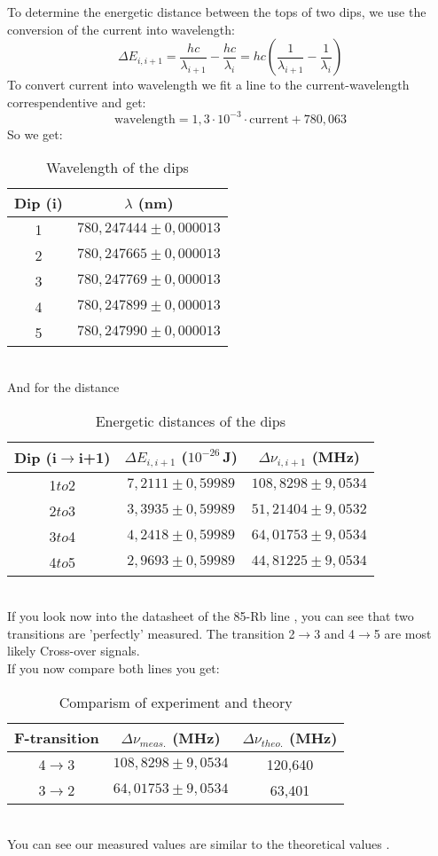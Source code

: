 To determine the energetic distance between the tops of two dips, we use the conversion of the current into wavelength:
\begin{equation}
    \Delta E_{i,i+1}=\frac{hc}{\lambda_{i+1}}-\frac{hc}{\lambda_{i}}=hc\left(\frac{1}{\lambda_{i+1}}-\frac{1}{\lambda_{i}}\right)
\end{equation}
To convert current into wavelength we fit a line to the current-wavelength correspendentive and get:
\begin{equation}
    \text{wavelength} = 1,3\cdot10^{-3}\cdot\text{current}+780,063
\end{equation}\newpage
So we get:
\begin{table}[h]
    \centering\begin{tabular}{c|c}
        Dip (i)& $\lambda$ (nm)\\\hline
        1&$780,247444\pm0,000013$\\
        2&$780,247665\pm0,000013$\\
        3&$780,247769\pm0,000013$\\
        4&$780,247899\pm0,000013$\\
        5&$780,247990\pm0,000013$
    \end{tabular}
    \caption{Wavelength of the dips}
\end{table}\\
And for the distance
\begin{table}[h]
    \centering\begin{tabular}{c|cc}
        Dip (i$\to$i+1)& $\Delta E_{i,i+1}$ ($10^{-26}\,$J)& $\Delta \nu_{i,i+1}$ (MHz)\\\hline
        1$to$2 &$7,2111\pm0,59989$&$108,8298\pm9,0534$\\
        2$to$3 &$3,3935\pm0,59989$&$51,21404\pm9,0532$\\
        3$to$4 &$4,2418\pm0,59989$&$64,01753\pm9,0534$\\
        4$to$5 &$2,9693\pm0,59989$&$44,81225\pm9,0534$
    \end{tabular}
    \caption{Energetic distances of the dips}
\end{table}\\
If you look now into the datasheet of the 85-Rb line \citep[][]{AnhangA}, you can see that two transitions are 'perfectly' measured.
The transition 2$\to$3 and 4$\to$5 are most likely Cross-over signals.\\

If you now compare both lines you get:
\begin{table}[h]
    \centering\begin{tabular}{c|cc}
        F-transition&$\Delta \nu_{meas.}$ (MHz) & $\Delta \nu_{theo.}$ (MHz) \\\hline
        4$\to$3 &$108,8298\pm9,0534$&120,640\\
        3$\to$2 &$64,01753\pm9,0534$ & 63,401
    \end{tabular}
    \caption{Comparism of experiment and theory}
\end{table}\\
You can see our measured values are similar to the theoretical values \citep[][]{AnhangA}.\\

